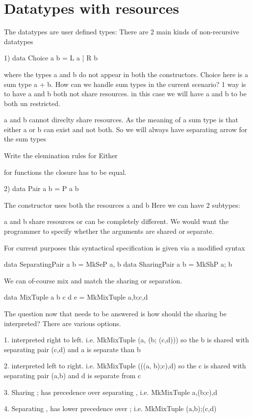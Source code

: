 \chapter{Datatypes with resources}

The datatypes are user defined types:
There are 2 main kinds of non-recursive datatypes

1) data Choice a b = L a | R b

where the types a and b do not appear in both the constructors.
Choice here is a sum type a + b. How can we handle sum types in the current scenario?
1 way is to have a and b both not share resources. in this case we will have
a and b to be both un restricted.

a and b cannot direclty share resources. As the meaning of a sum type is that
either a or b can exist and not both. So we will always have separating arrow
for the sum types

Write the elemination rules for Either

for functions the closure has to be equal.

2) data Pair a b = P a b

The constructor uses both the resources a and b
Here we can have 2 subtypes:

a and b share resources or can be completely different.
We would want the programmer to specify whether the arguments are shared or separate.

For current purposes this syntactical specification is given via a modified syntax

data SeparatingPair a b = MkSeP a, b
data SharingPair a b = MkShP a; b

We can of-course mix and match the sharing or separation.

data MixTuple a b c d e = MkMixTuple a,b;c,d

The question now that needs to be answered is how should the sharing be interpreted?
There are various options.

1. interpreted right to left. i.e. MkMixTuple (a, (b; (c,d)))
   so the b is shared with separating pair (c,d) and a is separate than b

2. interpreted left to right. i.e. MkMixTuple (((a, b);c),d)
   so the c is shared with separating pair (a,b) and d is separate from c

3. Sharing ; has precedence over separating , i.e. MkMixTuple a,(b;c),d

4. Separating , has lower precedence over ; i.e. MkMixTuple (a,b);(c,d)


